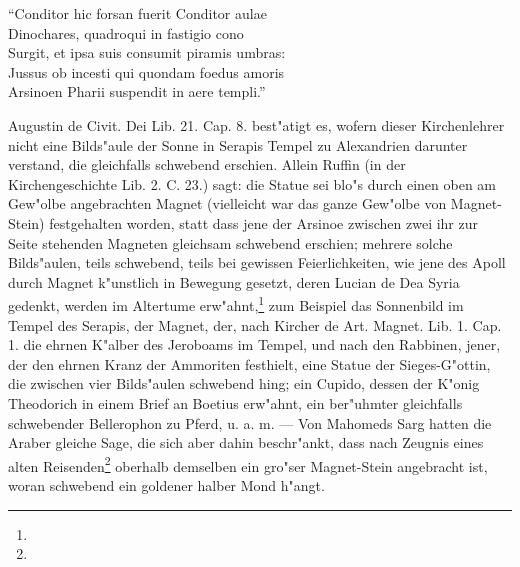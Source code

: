\documentclass[a4paper, 11pt, oneside, polutonikogreek, german]{article}
\begin{document}
"`Conditor hic forsan fuerit Conditor aulae\\
\hspace*{0.5cm} Dinochares, quadroqui in fastigio cono\\
\hspace*{0.5cm} Surgit, et ipsa suis consumit piramis umbras:\\
\hspace*{0.5cm} Jussus ob incesti qui quondam foedus amoris\\
\hspace*{0.5cm} Arsinoen Pharii suspendit in aere templi."'

Augustin de Civit. Dei Lib. 21. Cap. 8. best"atigt es, wofern dieser Kirchenlehrer nicht eine Bilds"aule der Sonne in Serapis Tempel zu Alexandrien darunter verstand, die gleichfalls schwebend erschien. Allein Ruffin (in der Kirchengeschichte Lib. 2. C. 23.) sagt: die Statue sei blo"s durch einen oben am Gew"olbe angebrachten Magnet (vielleicht war das ganze Gew"olbe von Magnet-Stein) festgehalten worden, statt dass jene der Arsinoe zwischen zwei ihr zur Seite stehenden Magneten gleichsam schwebend erschien; mehrere solche Bilds"aulen, teils schwebend, teils bei gewissen Feierlichkeiten, wie jene des Apoll durch Magnet k"unstlich in Bewegung gesetzt, deren Lucian de Dea Syria gedenkt, werden im Altertume erw"ahnt,\footnote{} zum Beispiel das Sonnenbild im Tempel des Serapis, der Magnet, der, nach Kircher de Art. Magnet. Lib. 1. Cap. 1. die ehrnen K"alber des Jeroboams im Tempel, und nach den Rabbinen, jener, der den ehrnen Kranz der Ammoriten festhielt, eine Statue der Sieges-G"ottin, die zwischen vier Bilds"aulen schwebend hing; ein Cupido, dessen der K"onig Theodorich in einem Brief an Boetius erw"ahnt, ein ber"uhmter gleichfalls schwebender Bellerophon zu Pferd, u. a. m. --- Von Mahomeds Sarg hatten die Araber gleiche Sage, die sich aber dahin beschr"ankt, dass nach Zeugnis eines alten Reisenden\footnote{} oberhalb demselben ein gro"ser Magnet-Stein angebracht ist, woran schwebend ein goldener halber Mond h"angt.
\end{document}
